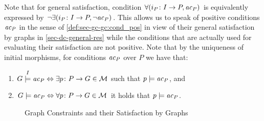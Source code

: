 \begin{remark}
\label{rem:sec-gc-gc:init_gen_sat}
Note that for general satisfaction, condition $\forall(i_P\colon I \to P,\mathit{ac}_P)$ is equivalently expressed by $\neg\exists(i_P\colon I \to P,\neg\mathit{ac}_P)$.
This allows us to speak of positive conditions $\mathit{ac}_P$ in the sense of \cref{def:sec-gc-gc:cond_pos} in view of their general satisfaction by graphs in \cref{sec-dc-general-res} while the conditions that are actually used for evaluating their satisfaction are not positive.
Note that by the uniqueness of initial morphisms, for conditions $\mathit{ac}_P$ over $P$ we have that:
\begin{enumerate}
  \item $G \stackrel{I}{\models} \mathit{ac}_P \Leftrightarrow \exists p\colon P \to G \in {\cal M}$ such that $p \models \mathit{ac}_P$, and
  \item $G \models \mathit{ac}_P \Leftrightarrow \forall p\colon P \to G \in {\cal M}$ it holds that $p \models \mathit{ac}_P$.
  \envEndMarker
\end{enumerate}
\end{remark}

\begin{figure}[!tb]
\begin{center}
\end{center}
\caption{Graph Constraints and their Satisfaction by Graphs}
\label{fig:sec-gc-gc:conditions}
\end{figure}

